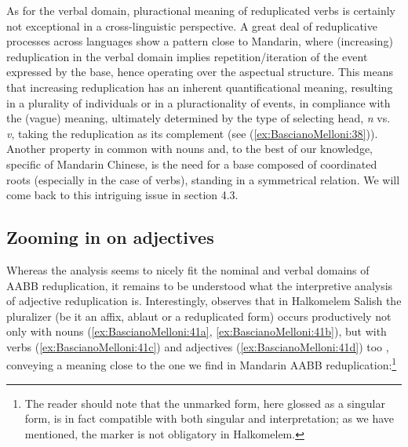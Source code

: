 \documentclass[output=paper]{langsci/langscibook}
\begin{document}
As for the verbal domain, pluractional meaning of reduplicated verbs is
certainly not exceptional in a cross-linguistic perspective. A great
deal of reduplicative processes across languages show a pattern close to
Mandarin, where (increasing) reduplication in the verbal domain implies
repetition/iteration of the event expressed by the base, hence
operating over the  aspectual structure. This means that increasing
reduplication has an inherent quantificational meaning, resulting in a
plurality of individuals or in a pluractionality of events, in
compliance with the (vague)  meaning, ultimately determined by the
type of selecting head, \emph{n} vs. \emph{v}, taking the reduplication
as its complement (see (\ref{ex:BascianoMelloni:38})). Another property in common with nouns and,
to the best of our knowledge, specific of Mandarin Chinese, is the need
for a base composed of coordinated roots (especially in the case of
verbs), standing in a symmetrical relation. We will come back to this
intriguing issue in section 4.3.

\subsection{Zooming in on adjectives}

Whereas the  analysis seems to nicely fit the nominal and verbal
domains of AABB reduplication, it remains to be understood what the
interpretive analysis of adjective reduplication is. Interestingly,
%
\citet{Wiltschko2008} %
%
observes that in Halkomelem Salish the pluralizer (be
it an affix, ablaut or a reduplicated form) occurs productively not only
with nouns (\ref{ex:BascianoMelloni:41a}, \ref{ex:BascianoMelloni:41b}), but with verbs (\ref{ex:BascianoMelloni:41c}) and adjectives (\ref{ex:BascianoMelloni:41d}) too
%
\citep[641, 679-680]{Wiltschko2008}%
%
, conveying a meaning close to the one we
find in Mandarin AABB reduplication:\footnote{The reader should note that the unmarked form, here
      glossed as a singular form, is in fact compatible with both singular
      and  interpretation; as we have mentioned, the  marker is
      not obligatory in Halkomelem.}
\end{document}
